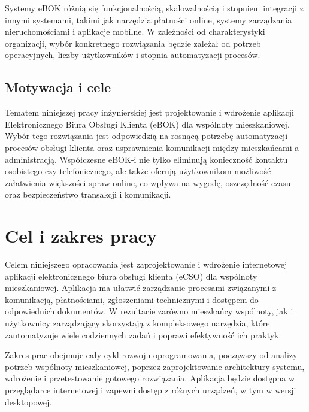 Systemy eBOK różnią się funkcjonalnością, skalowalnością i stopniem integracji z innymi systemami, takimi jak narzędzia płatności online, systemy zarządzania nieruchomościami i aplikacje mobilne. W zależności od charakterystyki organizacji, wybór konkretnego rozwiązania będzie zależał od potrzeb operacyjnych, liczby użytkowników i stopnia automatyzacji procesów.

\subsection{Motywacja i cele}

Tematem niniejszej pracy inżynierskiej jest projektowanie i wdrożenie aplikacji Elektronicznego Biura Obsługi Klienta (eBOK) dla wspólnoty mieszkaniowej. Wybór tego rozwiązania jest odpowiedzią na rosnącą potrzebę automatyzacji procesów obsługi klienta oraz usprawnienia komunikacji między mieszkańcami a administracją. Współczesne eBOK-i nie tylko eliminują konieczność kontaktu osobistego czy telefonicznego, ale także oferują użytkownikom możliwość załatwienia większości spraw online, co wpływa na wygodę, oszczędność czasu oraz bezpieczeństwo transakcji i komunikacji.


\section{Cel i zakres pracy}


Celem niniejszego opracowania jest zaprojektowanie i wdrożenie internetowej aplikacji elektronicznego biura obsługi klienta (eCSO) dla wspólnoty mieszkaniowej. Aplikacja ma ułatwić zarządzanie procesami związanymi z komunikacją, płatnościami, zgłoszeniami technicznymi i dostępem do odpowiednich dokumentów. W rezultacie zarówno mieszkańcy wspólnoty, jak i użytkownicy zarządzający skorzystają z kompleksowego narzędzia, które zautomatyzuje wiele codziennych zadań i poprawi efektywność ich praktyk.

Zakres prac obejmuje cały cykl rozwoju oprogramowania, począwszy od analizy potrzeb wspólnoty mieszkaniowej, poprzez zaprojektowanie architektury systemu, wdrożenie i przetestowanie gotowego rozwiązania. Aplikacja będzie dostępna w przeglądarce internetowej i zapewni dostęp z różnych urządzeń, w tym w wersji desktopowej. 

